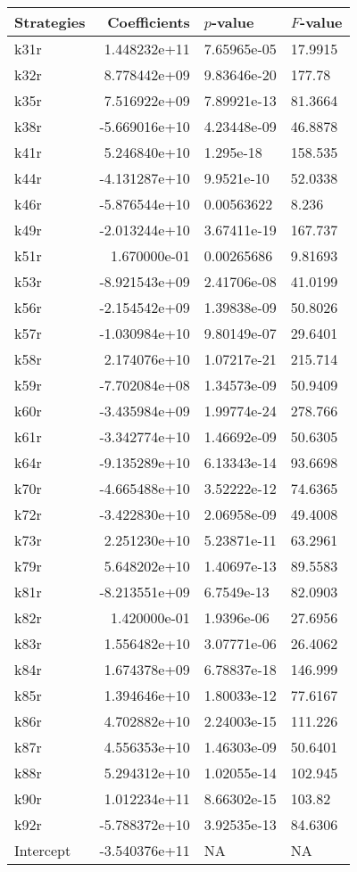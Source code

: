 \begin{tabular}{lrll}
\toprule
Strategies &  Coefficients &    $p$-value & $F$-value \\
\midrule
      k31r &  1.448232e+11 &  7.65965e-05 &   17.9915 \\
      k32r &  8.778442e+09 &  9.83646e-20 &    177.78 \\
      k35r &  7.516922e+09 &  7.89921e-13 &   81.3664 \\
      k38r & -5.669016e+10 &  4.23448e-09 &   46.8878 \\
      k41r &  5.246840e+10 &    1.295e-18 &   158.535 \\
      k44r & -4.131287e+10 &   9.9521e-10 &   52.0338 \\
      k46r & -5.876544e+10 &   0.00563622 &     8.236 \\
      k49r & -2.013244e+10 &  3.67411e-19 &   167.737 \\
      k51r &  1.670000e-01 &   0.00265686 &   9.81693 \\
      k53r & -8.921543e+09 &  2.41706e-08 &   41.0199 \\
      k56r & -2.154542e+09 &  1.39838e-09 &   50.8026 \\
      k57r & -1.030984e+10 &  9.80149e-07 &   29.6401 \\
      k58r &  2.174076e+10 &  1.07217e-21 &   215.714 \\
      k59r & -7.702084e+08 &  1.34573e-09 &   50.9409 \\
      k60r & -3.435984e+09 &  1.99774e-24 &   278.766 \\
      k61r & -3.342774e+10 &  1.46692e-09 &   50.6305 \\
      k64r & -9.135289e+10 &  6.13343e-14 &   93.6698 \\
      k70r & -4.665488e+10 &  3.52222e-12 &   74.6365 \\
      k72r & -3.422830e+10 &  2.06958e-09 &   49.4008 \\
      k73r &  2.251230e+10 &  5.23871e-11 &   63.2961 \\
      k79r &  5.648202e+10 &  1.40697e-13 &   89.5583 \\
      k81r & -8.213551e+09 &   6.7549e-13 &   82.0903 \\
      k82r &  1.420000e-01 &   1.9396e-06 &   27.6956 \\
      k83r &  1.556482e+10 &  3.07771e-06 &   26.4062 \\
      k84r &  1.674378e+09 &  6.78837e-18 &   146.999 \\
      k85r &  1.394646e+10 &  1.80033e-12 &   77.6167 \\
      k86r &  4.702882e+10 &  2.24003e-15 &   111.226 \\
      k87r &  4.556353e+10 &  1.46303e-09 &   50.6401 \\
      k88r &  5.294312e+10 &  1.02055e-14 &   102.945 \\
      k90r &  1.012234e+11 &  8.66302e-15 &    103.82 \\
      k92r & -5.788372e+10 &  3.92535e-13 &   84.6306 \\
 Intercept & -3.540376e+11 &           NA &        NA \\
\bottomrule
\end{tabular}
